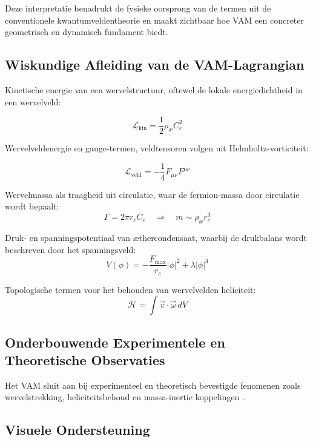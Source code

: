 Deze interpretatie benadrukt de fysieke oorsprong van de termen uit de conventionele kwantumveldentheorie en maakt zichtbaar hoe VAM een concreter geometrisch en dynamisch fundament biedt.


\subsection*{Wiskundige Afleiding van de VAM-Lagrangian}

Kinetische energie van een wervelstructuur, oftewel de lokale energiedichtheid in een wervelveld:

\[
    \mathcal{L}_\text{kin} = \frac{1}{2}\rho_\text{\ae} C_e^2
\]

Wervelveldenergie en gauge-termen, veldtensoren volgen uit Helmholtz-vorticiteit:

\[
    \mathcal{L}_\text{veld} = -\frac{1}{4}F_{\mu\nu}F^{\mu\nu}
\]

Wervelmassa als traagheid uit circulatie, waar de fermion-massa door circulatie wordt bepaalt:
\[
    \Gamma = 2\pi r_c C_e \quad\Rightarrow\quad m \sim \rho_\text{\ae} r_c^3
\]

Druk- en spanningspotentiaal van æthercondensaat, waarbij de drukbalans wordt beschreven door het spanningsveld:
\[
    V(\phi) = -\frac{F_\text{max}}{r_c}|\phi|^2 + \lambda|\phi|^4
\]

Topologische termen voor het behouden van wervelvelden heliciteit:
\[
    \mathcal{H} = \int \vec{v}\cdot\vec{\omega}\, dV
\]

\subsection*{Onderbouwende Experimentele en Theoretische Observaties}
Het VAM sluit aan bij experimenteel en theoretisch bevestigde fenomenen zoals wervelstrekking, heliciteitsbehoud en massa-inertie koppelingen \cite{batchelor1953,vinen2002,bewley2008,moffatt1969,kleckner2013,scheeler2014,bartlett1986}.

\subsection*{Visuele Ondersteuning}

